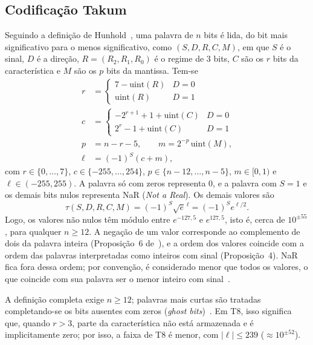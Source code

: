 \documentclass[journal]{IEEEtran}
\begin{document}
\subsection{Codificação Takum}
Seguindo a definição de Hunhold~\cite{hunhold2024beating,hunhold2024codec},
uma palavra de $n$ bits é lida, do bit mais significativo para o menos
significativo, como $(S, D, R, C, M)$, em que $S$ é o sinal, $D$ é a
direção, $R=(R_2,R_1,R_0)$ é o regime de 3 bits, $C$ são os $r$ bits da
característica e $M$ são os $p$ bits da mantissa. Tem-se
\begin{align}
r &= \begin{cases} 7 - \mathrm{uint}(R) & D = 0\\
                   \mathrm{uint}(R)     & D = 1 \end{cases} \label{eq:r}\\
c &= \begin{cases} -2^{r+1} + 1 + \mathrm{uint}(C) & D = 0\\
                    2^{r} - 1 + \mathrm{uint}(C)    & D = 1 \end{cases} \label{eq:c}\\
p &= n - r - 5, \qquad m = 2^{-p}\,\mathrm{uint}(M), \label{eq:p}\\
\ell &= (-1)^S (c + m), \label{eq:l}
\end{align}
com $r \in \{0,\dots,7\}$, $c \in \{-255,\dots,254\}$,
$p \in \{n-12,\dots,n-5\}$, $m \in [0,1)$ e $\ell \in (-255, 255)$.
A palavra só com zeros representa 0, e a palavra com $S=1$ e os demais
bits nulos representa NaR (\emph{Not a Real}). Os demais valores são
\begin{equation}
\tau(S,D,R,C,M) = (-1)^S \sqrt{e}^{\,\ell} = (-1)^S e^{\ell/2}.
\end{equation}
Logo, os valores não nulos têm módulo entre $e^{-127{,}5}$ e
$e^{127{,}5}$, isto é, cerca de $10^{\pm 55}$, para qualquer $n \geq 12$. A negação
de um valor corresponde ao complemento de dois da palavra inteira
(Proposição~6 de~\cite{hunhold2024beating}), e a ordem dos valores coincide
com a ordem das palavras interpretadas como inteiros com sinal
(Proposição~4). NaR fica fora dessa ordem; por convenção, é considerado
menor que todos os valores, o que coincide com sua palavra ser o menor
inteiro com sinal~\cite{hunhold2024beating}.

A definição completa exige $n \geq 12$; palavras mais curtas são tratadas
completando-se os bits ausentes com zeros (\emph{ghost
bits})~\cite{hunhold2024beating}. Em T8, isso significa que, quando $r>3$,
parte da característica não está armazenada e é implicitamente zero;
por isso, a faixa de T8 é menor, com $|\ell| \leq 239$ ($\approx 10^{\pm 52}$).
\end{document}

